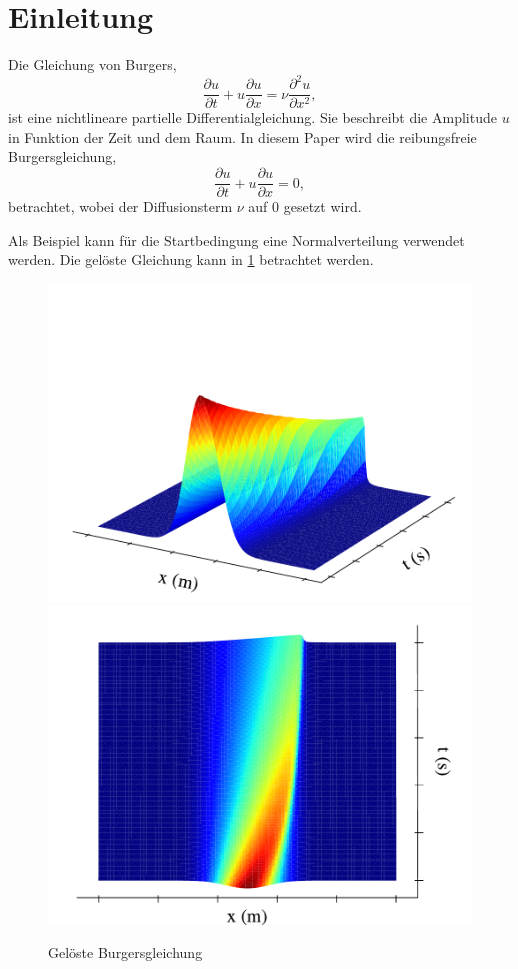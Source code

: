 %
%
\section{Einleitung \label{burgers:section:einleitung}}
	
	Die Gleichung von Burgers,
	\begin{equation}
		  \frac {\partial u}{\partial t}+u{\frac {\partial u}{\partial x}}=\nu {\frac {\partial ^{2}u}{\partial x^{2}}},
		  \label{burgers:eq_burgers}
	\end{equation}
	ist eine nichtlineare partielle Differentialgleichung.
	Sie beschreibt die Amplitude $u$ in Funktion der Zeit und dem Raum.
	In diesem Paper wird die reibungsfreie Burgersgleichung, 
	\begin{equation}
		\frac {\partial u}{\partial t}+u{\frac {\partial u}{\partial x}}=0,
		\label{burgers:eq_invisid_burgers}
	\end{equation}
	betrachtet, wobei der Diffusionsterm $\nu$ auf 0 gesetzt wird.
	
	Als Beispiel kann f\"ur die Startbedingung eine Normalverteilung verwendet werden.
	Die gel\"oste Gleichung kann in \ref{burgers:fig:b1} betrachtet werden.
	
	    \begin{figure}
		\centering
		\includegraphics[width=.49\textwidth]{papers/burgers/BurgersEquation/images/Implicit_front.pdf}
		\includegraphics[width=.49\textwidth]{papers/burgers/BurgersEquation/images/Implicit_top.pdf}
		\caption{Gel\"oste Burgersgleichung}
		\label{burgers:fig:b1}
		\end{figure}
	
